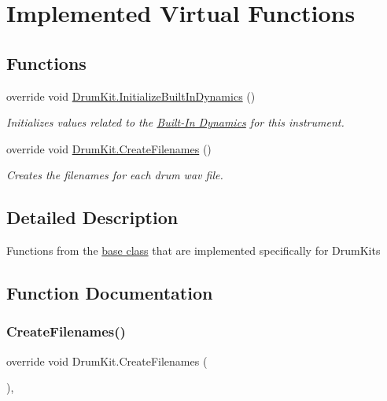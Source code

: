 \hypertarget{group___drum_virt_func}{}\section{Implemented Virtual Functions}
\label{group___drum_virt_func}
\subsection*{Functions}
\begin{DoxyCompactItemize}
\item 
override void \hyperlink{group___drum_virt_func_gad14c6155e6ec62f26a30261e273d6379}{Drum\+Kit.\+Initialize\+Built\+In\+Dynamics} ()
\begin{DoxyCompactList}\small\item\em Initializes values related to the \hyperlink{group___audio_DefBID}{Built-\/\+In Dynamics} for this instrument. \end{DoxyCompactList}\item 
override void \hyperlink{group___drum_virt_func_ga25bb92cf56bc1b3434465faf73cd09cf}{Drum\+Kit.\+Create\+Filenames} ()
\begin{DoxyCompactList}\small\item\em Creates the filenames for each drum wav file. \end{DoxyCompactList}\end{DoxyCompactItemize}


\subsection{Detailed Description}
Functions from the \hyperlink{group___v_i_base}{base class} that are implemented specifically for Drum\+Kits 

\subsection{Function Documentation}
\mbox{\label{group___drum_virt_func_ga25bb92cf56bc1b3434465faf73cd09cf}} 
\subsubsection{\texorpdfstring{Create\+Filenames()}{CreateFilenames()}}
{\footnotesize\ttfamily override void Drum\+Kit.\+Create\+Filenames (\begin{DoxyParamCaption}{ }\end{DoxyParamCaption})\hspace{0.3cm}{\ttfamily [protected]}, {\ttfamily [virtual]}}



